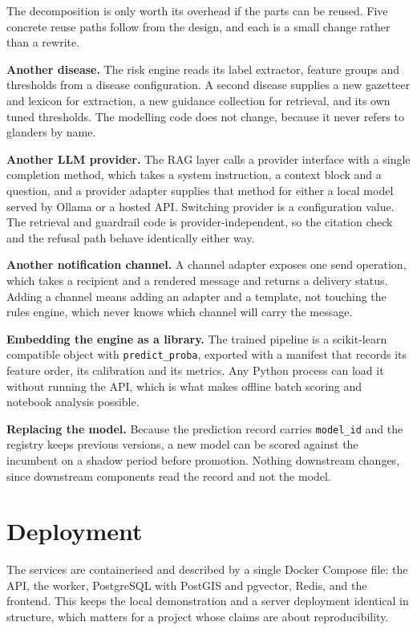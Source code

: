 \documentclass[10pt,openany]{report}
\begin{document}
The decomposition is only worth its overhead if the parts can be reused. Five concrete reuse
paths follow from the design, and each is a small change rather than a rewrite.

\textbf{Another disease.} The risk engine reads its label extractor, feature groups and
thresholds from a disease configuration. A second disease supplies a new gazetteer and lexicon
for extraction, a new guidance collection for retrieval, and its own tuned thresholds. The
modelling code does not change, because it never refers to glanders by name.

\textbf{Another LLM provider.} The RAG layer calls a provider interface with a single completion
method, which takes a system instruction, a context block and a question, and a provider adapter
supplies that method for either a local model served by Ollama or a hosted API. Switching provider is a configuration value. The retrieval and
guardrail code is provider-independent, so the citation check and the refusal path behave
identically either way.

\textbf{Another notification channel.} A channel adapter exposes one send operation, which takes
a recipient and a rendered message and returns a delivery status. Adding a channel means
adding an adapter and a template, not touching the rules engine, which never knows which channel
will carry the message.

\textbf{Embedding the engine as a library.} The trained pipeline is a scikit-learn compatible
object \cite{pedregosa2011} with \texttt{predict\_proba}, exported with a manifest that records its feature order,
its calibration and its metrics. Any Python process can load it without running the API, which is
what makes offline batch scoring and notebook analysis possible.

\textbf{Replacing the model.} Because the prediction record carries \texttt{model\_id} and the
registry keeps previous versions, a new model can be scored against the incumbent on a shadow
period before promotion. Nothing downstream changes, since downstream components read the record
and not the model.

\section{Deployment}

The services are containerised and described by a single Docker Compose file: the API, the worker,
PostgreSQL with PostGIS and pgvector, Redis, and the frontend. This keeps the local demonstration
and a server deployment identical in structure, which matters for a project whose claims are about
reproducibility.
\end{document}
